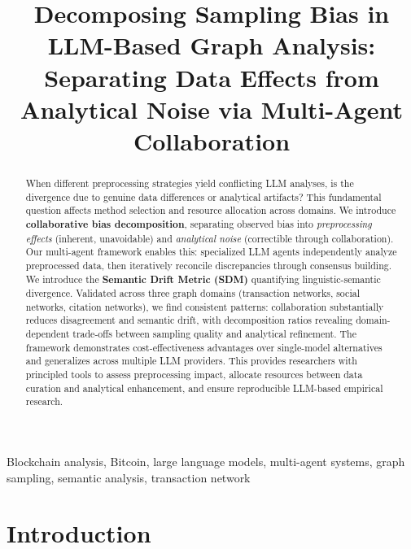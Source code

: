 \documentclass[conference]{IEEEtran}
\begin{document}
\title{Decomposing Sampling Bias in LLM-Based Graph Analysis:\\ Separating Data Effects from Analytical Noise via Multi-Agent Collaboration}

\author{
}

\maketitle

\begin{abstract}
When different preprocessing strategies yield conflicting LLM analyses, is the divergence due to genuine data differences or analytical artifacts? This fundamental question affects method selection and resource allocation across domains. We introduce \textbf{collaborative bias decomposition}, separating observed bias into \textit{preprocessing effects} (inherent, unavoidable) and \textit{analytical noise} (correctible through collaboration). Our multi-agent framework enables this: specialized LLM agents independently analyze preprocessed data, then iteratively reconcile discrepancies through consensus building. We introduce the \textbf{Semantic Drift Metric (SDM)} quantifying linguistic-semantic divergence. Validated across three graph domains (transaction networks, social networks, citation networks), we find consistent patterns: collaboration substantially reduces disagreement and semantic drift, with decomposition ratios revealing domain-dependent trade-offs between sampling quality and analytical refinement. The framework demonstrates cost-effectiveness advantages over single-model alternatives and generalizes across multiple LLM providers. This provides researchers with principled tools to assess preprocessing impact, allocate resources between data curation and analytical enhancement, and ensure reproducible LLM-based empirical research.
\end{abstract}


\begin{IEEEkeywords}
Blockchain analysis, Bitcoin, large language models, multi-agent systems, graph sampling, semantic analysis, transaction network
\end{IEEEkeywords}




\section{Introduction}
\end{document}
